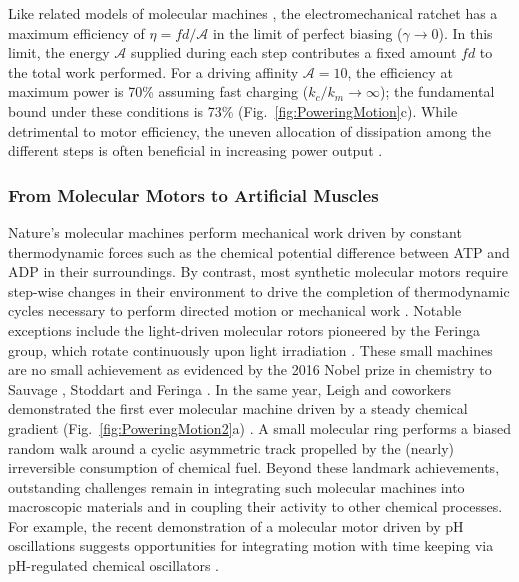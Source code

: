 \begin{appendices}
Like related models of molecular machines \cite{Pietzonka2016}, the electromechanical ratchet has a maximum efficiency of $\eta=f d/\mathcal{A}$ in the limit of perfect biasing ($\gamma\rightarrow 0$).  In this limit, the energy $\mathcal{A}$ supplied during each step contributes a fixed amount $f d$ to the total work performed.  For a driving affinity $\mathcal{A}=10$, the efficiency at maximum power is 70\% assuming fast charging ($k_c/k_m\rightarrow\infty$); the fundamental bound under these conditions is 73\% (Fig.~\ref{fig:PoweringMotion}c).  While detrimental to motor efficiency, the uneven allocation of dissipation among the different steps is often beneficial in increasing power output \cite{brown2017allocating}. 

\subsubsection{From Molecular Motors to Artificial Muscles}

Nature's molecular machines perform mechanical work driven by constant thermodynamic forces such as the chemical potential difference between ATP and ADP in their surroundings.  By contrast, most synthetic molecular motors require step-wise changes in their environment to drive the completion of thermodynamic cycles necessary to perform directed motion or mechanical work \cite{coskun2012great, Erbas-Cakmak2015, kassem2017artificial, pezzato2017mastering}.  Notable exceptions include the light-driven molecular rotors pioneered by the Feringa group, which rotate continuously upon light irradiation \cite{koumura1999light}.  These small machines are no small achievement as evidenced by the 2016 Nobel prize in chemistry to Sauvage \cite{sauvage2017chemical}, Stoddart \cite{Stoddart2017} and Feringa \cite{Feringa2017}. In the same year, Leigh and coworkers demonstrated the first ever molecular machine driven by a steady chemical gradient  (Fig.~\ref{fig:PoweringMotion2}a) \cite{Wilson2016}. A small molecular ring performs a biased random walk around a cyclic asymmetric track propelled by the (nearly) irreversible consumption of chemical fuel. Beyond these landmark achievements, outstanding challenges remain in integrating such molecular machines into macroscopic materials and in coupling their activity to other chemical processes.  For example, the recent demonstration of a molecular motor driven by pH oscillations \cite{Erbas-Cakmak2017} suggests opportunities for integrating motion with time keeping via pH-regulated chemical oscillators \cite{orbán2015ph}.


\end{appendices}
